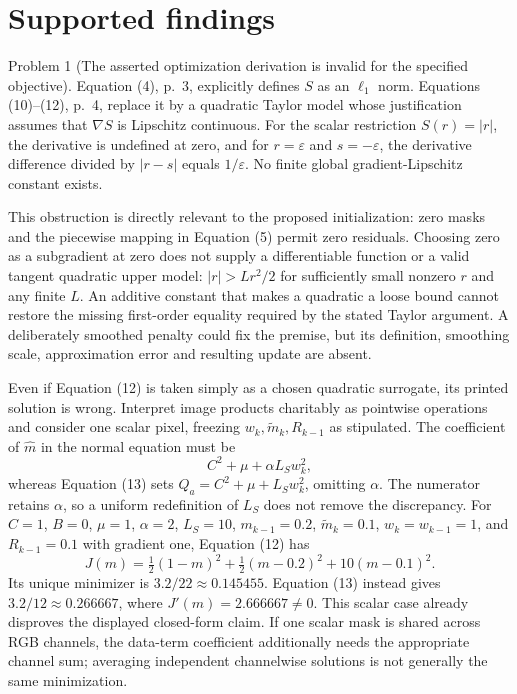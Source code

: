 \documentclass[10pt]{article}
\begin{document}
\section*{Supported findings}
Problem 1 (The asserted optimization derivation is invalid for the specified objective).  Equation (4), p. 3, explicitly defines \(S\) as an \(\ell_1\) norm. Equations (10)–(12), p. 4, replace it by a quadratic Taylor model whose justification assumes that \(\nabla S\) is Lipschitz continuous. For the scalar restriction \(S(r)=|r|\), the derivative is undefined at zero, and for \(r=\varepsilon\) and \(s=-\varepsilon\), the derivative difference divided by \(|r-s|\) equals \(1/\varepsilon\). No finite global gradient-Lipschitz constant exists.\par
This obstruction is directly relevant to the proposed initialization: zero masks and the piecewise mapping in Equation (5) permit zero residuals. Choosing zero as a subgradient at zero does not supply a differentiable function or a valid tangent quadratic upper model: \(|r|>Lr^2/2\) for sufficiently small nonzero \(r\) and any finite \(L\). An additive constant that makes a quadratic a loose bound cannot restore the missing first-order equality required by the stated Taylor argument. A deliberately smoothed penalty could fix the premise, but its definition, smoothing scale, approximation error and resulting update are absent.\par
Even if Equation (12) is taken simply as a chosen quadratic surrogate, its printed solution is wrong. Interpret image products charitably as pointwise operations and consider one scalar pixel, freezing \(w_k,\widetilde m_k,R_{k-1}\) as stipulated. The coefficient of \(\widehat m\) in the normal equation must be \[C^2+\mu+\alpha L_S w_k^2,\] whereas Equation (13) sets \(Q_a=C^2+\mu+L_Sw_k^2\), omitting \(\alpha\). The numerator retains \(\alpha\), so a uniform redefinition of \(L_S\) does not remove the discrepancy. For \(C=1\), \(B=0\), \(\mu=1\), \(\alpha=2\), \(L_S=10\), \(m_{k-1}=0.2\), \(\widetilde m_k=0.1\), \(w_k=w_{k-1}=1\), and \(R_{k-1}=0.1\) with gradient one, Equation (12) has \[J(m)=\tfrac12(1-m)^2+\tfrac12(m-0.2)^2+10(m-0.1)^2.\] Its unique minimizer is \(3.2/22\approx0.145455\). Equation (13) instead gives \(3.2/12\approx0.266667\), where \(J'(m)=2.666667\ne0\). This scalar case already disproves the displayed closed-form claim. If one scalar mask is shared across RGB channels, the data-term coefficient additionally needs the appropriate channel sum; averaging independent channelwise solutions is not generally the same minimization.\par
\end{document}
